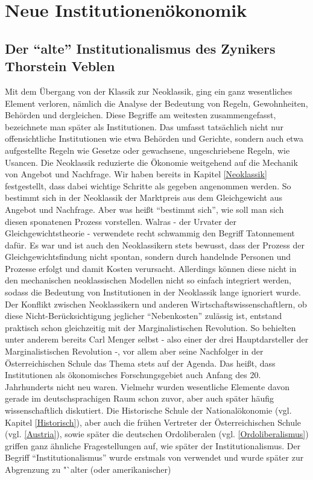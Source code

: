 %
%
%

\chapter{Neue Institutionenökonomik}
\label{Neue Institut}

\section{Der "`alte"' Institutionalismus des Zynikers Thorstein Veblen}

Mit dem Übergang von der Klassik zur Neoklassik, ging ein ganz wesentliches Element verloren, nämlich die Analyse der Bedeutung von Regeln, Gewohnheiten, Behörden und dergleichen. Diese Begriffe am weitesten zusammengefasst, bezeichnete man später als Institutionen. Das umfasst tatsächlich nicht nur offensichtliche Institutionen wie etwa Behörden und Gerichte, sondern auch etwa aufgestellte Regeln wie Gesetze oder gewachsene, ungeschriebene Regeln, wie Usancen. Die Neoklassik reduzierte die Ökonomie weitgehend auf die Mechanik von Angebot und Nachfrage. Wir haben bereits in Kapitel \ref{Neoklassik} festgestellt, dass dabei wichtige Schritte als gegeben angenommen werden. So bestimmt sich in der Neoklassik der Marktpreis aus dem Gleichgewicht aus Angebot und Nachfrage. Aber was heißt "`bestimmt sich"', wie soll man sich diesen sponatenen Prozess vorstellen. Walras - der Urvater der Gleichgewichtstheorie - verwendete recht schwammig den Begriff Tatonnement dafür. Es war und ist auch den Neoklassikern stets bewusst, dass der Prozess der Gleichgewichtsfindung nicht spontan, sondern durch handelnde Personen und Prozesse erfolgt und damit Kosten verursacht. Allerdings können diese nicht in den mechanischen neoklassischen Modellen nicht so einfach integriert werden, sodass die Bedeutung von Institutionen in der Neoklassik lange ignoriert wurde. Der Konflikt zwischen Neoklassikern und anderen Wirtschaftswissenschaftlern, ob diese Nicht-Berücksichtigung jeglicher "`Nebenkosten"' zulässig ist, entstand praktisch schon gleichzeitig mit der Marginalistischen Revolution. So behielten unter anderem bereits Carl Menger selbst - also einer der drei Hauptdarsteller der Marginalistischen Revolution -, vor allem aber seine Nachfolger in der Österreichischen Schule das Thema stets auf der Agenda. Das heißt, dass  Institutionen als ökonomisches Forschungsgebiet auch Anfang des 20. Jahrhunderts nicht neu waren. Vielmehr wurden wesentliche Elemente davon gerade im deutschsprachigen Raum schon zuvor, aber auch später häufig wissenschaftlich diskutiert. Die Historische Schule der Nationalökonomie (vgl. Kapitel \ref{Historisch}), aber auch die frühen Vertreter der Österreichischen Schule (vgl. \ref{Austria}), sowie später die deutschen Ordoliberalen (vgl. \ref{Ordoliberalismus}) griffen ganz ähnliche Fragestellungen auf, wie später der Institutionalismus. Der Begriff "`Institutionalismus"' wurde erstmals von \textcite{Hamilton1919} verwendet und wurde später zur Abgrenzung zu "`alter (oder amerikanischer) 